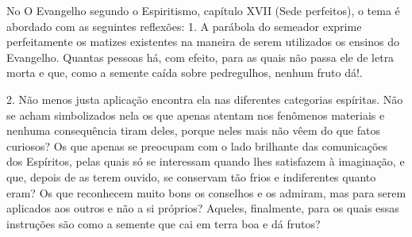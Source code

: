 \emdash{}No O Evangelho segundo o Espiritismo, capítulo XVII (Sede perfeitos), o tema é abordado com as seguintes reflexões: 1. A parábola do semeador exprime perfeitamente os matizes existentes na maneira de serem utilizados os ensinos do Evangelho. Quantas pessoas há, com efeito, para as quais não passa ele de letra morta e que, como a semente caída sobre pedregulhos, nenhum fruto dá!.

\emdash{}2. Não menos justa aplicação encontra ela nas diferentes categorias espíritas. Não se acham simbolizados nela os que apenas atentam nos fenômenos materiais e nenhuma consequência tiram deles, porque neles mais não vêem do que fatos curiosos? Os que apenas se preocupam com o lado brilhante das comunicações dos Espíritos, pelas quais só se interessam quando lhes satisfazem à imaginação, e que, depois de as terem ouvido, se conservam tão frios e indiferentes quanto eram? Os que reconhecem muito bons os conselhos e os admiram, mas para serem aplicados aos outros e não a si próprios? Aqueles, finalmente, para os quais essas instruções são como a semente que cai em terra boa e dá frutos?
